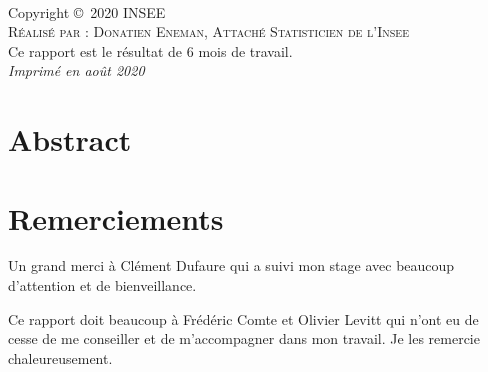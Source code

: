 \documentclass[11pt,fleqn]{book} %
\begin{document}




\newpage
~\vfill
\thispagestyle{empty}

\noindent Copyright \copyright\ 2020 INSEE\\ %

\noindent \textsc{Réalisé par : Donatien Eneman, Attaché Statisticien de l'Insee}\\ %

\noindent Ce rapport est le résultat de 6 mois de travail. \\ %

\noindent \textit{Imprimé en août 2020} %

\frontmatter
{} %
\chapter*{Abstract}

\chapter*{Remerciements}
\vspace{-2cm}

Un grand merci à Clément Dufaure qui a suivi mon stage avec beaucoup d’attention et
de bienveillance.\newline

Ce rapport doit beaucoup à Frédéric Comte et Olivier Levitt qui n’ont eu de cesse de me conseiller et de m’accompagner dans mon travail. Je les remercie chaleureusement. \newline
\end{document}
